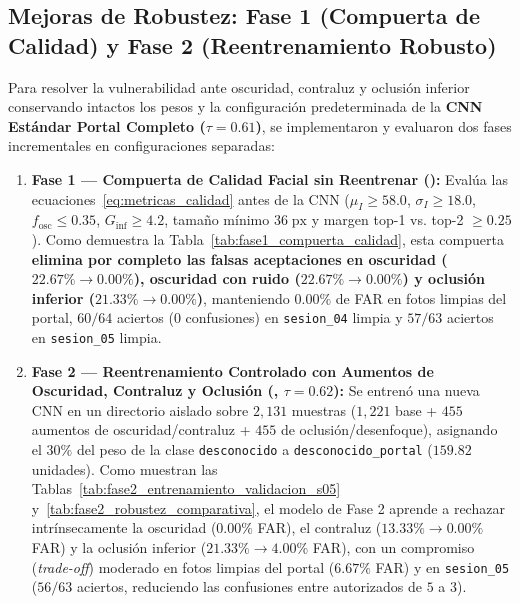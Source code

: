 \documentclass{article}
\begin{document}
\subsection{Mejoras de Robustez: Fase 1 (Compuerta de Calidad) y Fase 2 (Reentrenamiento Robusto)}
Para resolver la vulnerabilidad ante oscuridad, contraluz y oclusión inferior conservando intactos los pesos y la configuración predeterminada de la \textbf{CNN Estándar Portal Completo ($\tau = 0.61$)}, se implementaron y evaluaron dos fases incrementales en configuraciones separadas:

\begin{enumerate}
    \item \textbf{Fase 1 --- Compuerta de Calidad Facial sin Reentrenar ():} Evalúa las ecuaciones~\eqref{eq:metricas_calidad} antes de la CNN ($\mu_I \ge 58.0$, $\sigma_I \ge 18.0$, $f_{\text{osc}} \le 0.35$, $G_{\text{inf}} \ge 4.2$, tamaño mínimo $36\;\text{px}$ y margen top-1 vs. top-2 $\ge 0.25$). Como demuestra la Tabla~\ref{tab:fase1_compuerta_calidad}, esta compuerta \textbf{elimina por completo las falsas aceptaciones en oscuridad ($22.67\% \to 0.00\%$), oscuridad con ruido ($22.67\% \to 0.00\%$) y oclusión inferior ($21.33\% \to 0.00\%$)}, manteniendo $0.00\%$ de FAR en fotos limpias del portal, $60/64$ aciertos ($0$ confusiones) en \texttt{sesion\_04} limpia y $57/63$ aciertos en \texttt{sesion\_05} limpia.
    \item \textbf{Fase 2 --- Reentrenamiento Controlado con Aumentos de Oscuridad, Contraluz y Oclusión (, $\tau = 0.62$):} Se entrenó una nueva CNN en un directorio aislado sobre $2,131$ muestras ($1,221$ base + $455$ aumentos de oscuridad/contraluz + $455$ de oclusión/desenfoque), asignando el $30\%$ del peso de la clase \texttt{desconocido} a \texttt{desconocido\_portal} ($159.82$ unidades). Como muestran las Tablas~\ref{tab:fase2_entrenamiento_validacion_s05} y~\ref{tab:fase2_robustez_comparativa}, el modelo de Fase 2 aprende a rechazar intrínsecamente la oscuridad ($0.00\%$ FAR), el contraluz ($13.33\% \to 0.00\%$ FAR) y la oclusión inferior ($21.33\% \to 4.00\%$ FAR), con un compromiso (\textit{trade-off}) moderado en fotos limpias del portal ($6.67\%$ FAR) y en \texttt{sesion\_05} ($56/63$ aciertos, reduciendo las confusiones entre autorizados de $5$ a $3$).
\end{enumerate}
\end{document}
